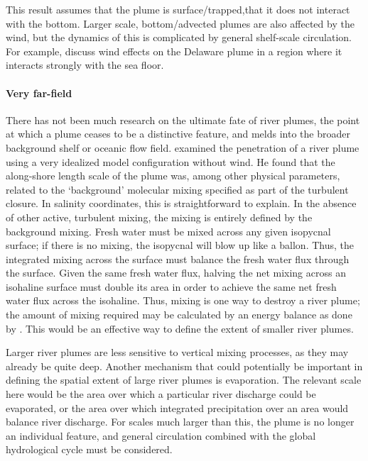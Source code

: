 \documentclass[11pt]{report}
\numberwithin{equation}{section}
\begin{document}
This result assumes that the plume is surface\-/trapped,that it does not interact with the bottom.  Larger scale, bottom\-/advected plumes are also affected by the wind, but the dynamics of this is complicated by general shelf-scale circulation.  For example, \citet{whitney.garvine:05} discuss wind effects on the Delaware plume in a region where it interacts strongly with the sea floor.  

\paragraph{Very far-field}

There has not been much research on the ultimate fate of river plumes, the point at which a plume ceases to be a distinctive feature, and melds into the broader background shelf or oceanic flow field.  \citet{garvine:99} examined the penetration of a river plume using a very idealized model configuration without wind.  He found that the along-shore length scale of the plume was, among other physical parameters, related to the ‘background’ molecular mixing specified as part of the turbulent closure.  In salinity coordinates, this is straightforward to explain.  In the absence of other active, turbulent mixing, the mixing is entirely defined by the background mixing.  Fresh water must be mixed across any given isopycnal surface; if there is no mixing, the isopycnal will blow up like a ballon.  Thus, the integrated mixing across the surface must balance the fresh water flux through the surface.  Given the same fresh water flux, halving the net mixing across an isohaline surface must double its area in order to achieve the same net fresh water flux across the isohaline.  Thus, mixing is one way to destroy a river plume; the amount of mixing required may be calculated by an energy balance as done by \citet{pritchard.huntley:02}.  This would be an effective way to define the extent of smaller river plumes.

Larger river plumes are less sensitive to vertical mixing processes, as they may already be quite deep.  Another mechanism that could potentially be important in defining the spatial extent of large river plumes is evaporation.  The relevant scale here would be the area over which a particular river discharge could be evaporated, or the area over which integrated precipitation over an area would balance river discharge.  For scales much larger than this, the plume is no longer an individual feature, and general circulation combined with the global hydrological cycle must be considered.
\end{document}
